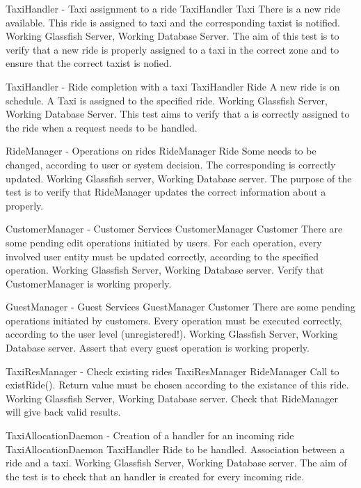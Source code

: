 \testx
{TaxiHandler - Taxi assignment to a ride}
{TaxiHandler}
{Taxi}
{There is a new ride available.}
{This ride is assigned to taxi and the corresponding taxist is notified.}
{Working Glassfish Server, Working Database Server.}
{The aim of this test is to verify that a new ride is properly assigned to
a taxi in the correct zone and to ensure that the correct taxist is nofied.}

\testx
{TaxiHandler - Ride completion with a taxi}
{TaxiHandler}
{Ride}
{A new ride is on schedule.}
{A Taxi is assigned to the specified ride.}
{Working Glassfish Server, Working Database Server.}
{This test aims to verify that a  is correctly assigned to the ride
when a request needs to be handled.}

\testx
{RideManager - Operations on rides}
{RideManager}
{Ride}
{Some  needs to be changed, according to user or system decision.}
{The corresponding  is correctly updated.}
{Working Glassfish server, Working Database server.}
{The purpose of the test is to verify that RideManager updates the correct
information about a  properly.}

\testx
{CustomerManager - Customer Services}
{CustomerManager}
{Customer}
{There are some pending edit operations initiated by users.}
{For each operation, every involved user entity must be updated correctly,
according to the specified operation.}
{Working Glassfish Server, Working Database server.}
{Verify that CustomerManager is working properly.}

\testx
{GuestManager - Guest Services}
{GuestManager}
{Customer}
{There are some pending operations initiated by customers.}
{Every operation must be executed correctly, according to the user level
(unregistered!).}
{Working Glassfish Server, Working Database server.}
{Assert that every guest operation is working properly.}

\testx
{TaxiResManager - Check existing rides}
{TaxiResManager}
{RideManager}
{Call to existRide().}
{Return value must be chosen according to the existance of this ride.}
{Working Glassfish Server, Working Database server.}
{Check that RideManager will give back valid results.}

\testx
{TaxiAllocationDaemon - Creation of a handler for an incoming ride}
{TaxiAllocationDaemon}
{TaxiHandler}
{Ride to be handled.}
{Association between a ride and a taxi.}
{Working Glassfish Server, Working Database server.}
{The aim of the test is to check that an handler is created for every incoming
ride.}

